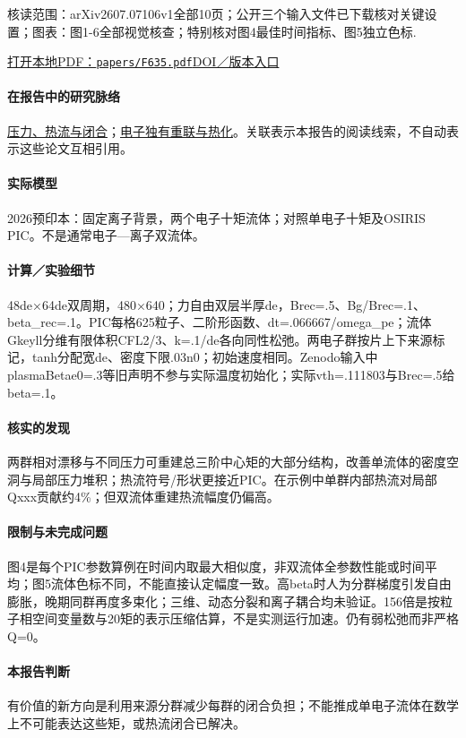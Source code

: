 \documentclass[UTF8,a4paper,11pt,openany,fontset=fandol]{ctexbook}
\begin{document}
\textsf{核读范围：}arXiv2607.07106v1全部10页；公开三个输入文件已下载核对关键设置；\textsf{图表：}图1-6全部视觉核查；特别核对图4最佳时间指标、图5独立色标.

\href{run:../papers/F635.pdf}{打开本地PDF：\texttt{papers/F635.pdf}}\quad\href{https://doi.org/10.48550/arxiv.2607.07106}{DOI／版本入口}

\paragraph{在报告中的研究脉络}\hyperref[story:closure]{压力、热流与闭合}；\hyperref[story:energy]{电子独有重联与热化}。关联表示本报告的阅读线索，不自动表示这些论文互相引用。

\paragraph{实际模型}2026预印本：固定离子背景，两个电子十矩流体；对照单电子十矩及OSIRIS PIC。不是通常电子—离子双流体。

\paragraph{计算／实验细节}48de×64de双周期，480×640；力自由双层半厚de，Brec=.5、Bg/Brec=.1、beta\_rec=.1。PIC每格625粒子、二阶形函数、dt=.066667/omega\_pe；流体Gkeyll分维有限体积CFL2/3、k=.1/de各向同性松弛。两电子群按片上下来源标记，tanh分配宽de、密度下限.03n0；初始速度相同。Zenodo输入中plasmaBetae0=.3等旧声明不参与实际温度初始化；实际vth=.111803与Brec=.5给beta=.1。

\paragraph{核实的发现}两群相对漂移与不同压力可重建总三阶中心矩的大部分结构，改善单流体的密度空洞与局部压力堆积；热流符号/形状更接近PIC。在示例中单群内部热流对局部Qxxx贡献约4\%；但双流体重建热流幅度仍偏高。

\paragraph{限制与未完成问题}图4是每个PIC参数算例在时间内取最大相似度，非双流体全参数性能或时间平均；图5流体色标不同，不能直接认定幅度一致。高beta时人为分群梯度引发自由膨胀，晚期同群再度多束化；三维、动态分裂和离子耦合均未验证。156倍是按粒子相空间变量数与20矩的表示压缩估算，不是实测运行加速。仍有弱松弛而非严格Q=0。

\paragraph{本报告判断}有价值的新方向是利用来源分群减少每群的闭合负担；不能推成单电子流体在数学上不可能表达这些矩，或热流闭合已解决。
\end{document}
